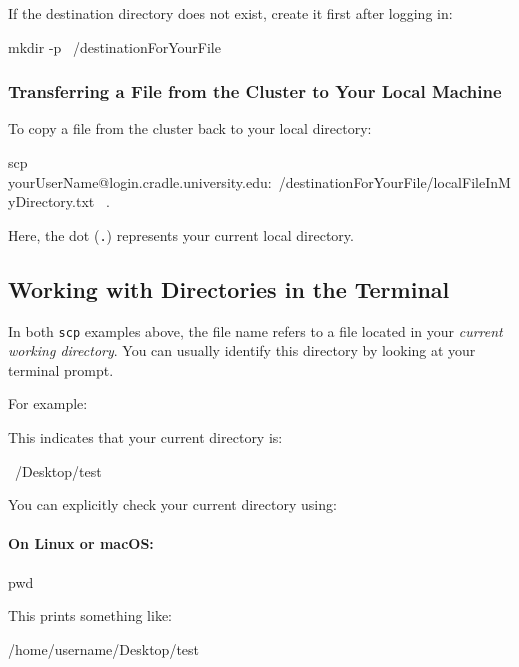 \documentclass[11pt]{article}
\begin{document}
If the destination directory does not exist, create it first after logging in:
\begin{codeblock}
mkdir -p ~/destinationForYourFile
\end{codeblock}

\subsubsection{Transferring a File from the Cluster to Your Local Machine}

To copy a file from the cluster back to your local directory:

\begin{codeblock}
scp yourUserName@login.cradle.university.edu:~/destinationForYourFile/localFileInMyDirectory.txt \
    .
\end{codeblock}

Here, the dot (\texttt{.}) represents your current local directory.

\subsection{Working with Directories in the Terminal}
\label{subsec:working-directories}

In both \texttt{scp} examples above, the file name refers to a file located in your
\emph{current working directory}. You can usually identify this directory by
looking at your terminal prompt.

For example:

This indicates that your current directory is:
\begin{codeblock}
~/Desktop/test
\end{codeblock}

You can explicitly check your current directory using:

\paragraph{On Linux or macOS:}
\begin{codeblock}
pwd
\end{codeblock}

This prints something like:
\begin{codeblock}
/home/username/Desktop/test
\end{codeblock}
\end{document}
